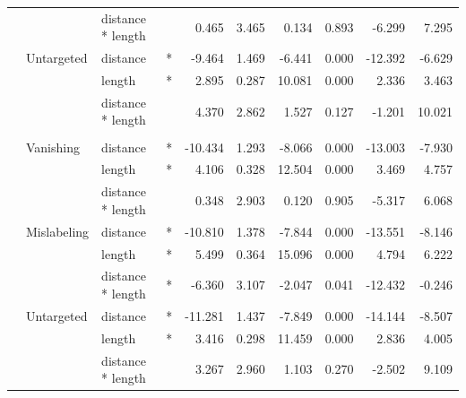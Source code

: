\documentclass[
]{article}
\begin{document}
\begin{longtable}[t]{llllrrrrrr}
\cmidrule{3-10}\nopagebreak
\hspace{1em} &  & distance * length &  & 0.465 & 3.465 & 0.134 & 0.893 & -6.299 & 7.295\\
\cmidrule{2-10}\nopagebreak
\hspace{1em} & Untargeted & distance & * & -9.464 & 1.469 & -6.441 & 0.000 & -12.392 & -6.629\\
\cmidrule{3-10}\nopagebreak
\hspace{1em} &  & length & * & 2.895 & 0.287 & 10.081 & 0.000 & 2.336 & 3.463\\
\cmidrule{3-10}\nopagebreak
\hspace{1em} &  & distance * length &  & 4.370 & 2.862 & 1.527 & 0.127 & -1.201 & 10.021\\
\cmidrule{1-10}\pagebreak[0]
\addlinespace[0.3em]
\multicolumn{10}{l}{\textbf{SSD}}\\
\hspace{1em} & Vanishing & distance & * & -10.434 & 1.293 & -8.066 & 0.000 & -13.003 & -7.930\\
\cmidrule{3-10}\nopagebreak
\hspace{1em} &  & length & * & 4.106 & 0.328 & 12.504 & 0.000 & 3.469 & 4.757\\
\cmidrule{3-10}\nopagebreak
\hspace{1em} &  & distance * length &  & 0.348 & 2.903 & 0.120 & 0.905 & -5.317 & 6.068\\
\cmidrule{2-10}\nopagebreak
\hspace{1em} & Mislabeling & distance & * & -10.810 & 1.378 & -7.844 & 0.000 & -13.551 & -8.146\\
\cmidrule{3-10}\nopagebreak
\hspace{1em} &  & length & * & 5.499 & 0.364 & 15.096 & 0.000 & 4.794 & 6.222\\
\cmidrule{3-10}\nopagebreak
\hspace{1em} &  & distance * length & * & -6.360 & 3.107 & -2.047 & 0.041 & -12.432 & -0.246\\
\cmidrule{2-10}\nopagebreak
\hspace{1em} & Untargeted & distance & * & -11.281 & 1.437 & -7.849 & 0.000 & -14.144 & -8.507\\
\cmidrule{3-10}\nopagebreak
\hspace{1em} &  & length & * & 3.416 & 0.298 & 11.459 & 0.000 & 2.836 & 4.005\\
\cmidrule{3-10}\nopagebreak
\hspace{1em} &  & distance * length &  & 3.267 & 2.960 & 1.103 & 0.270 & -2.502 & 9.109\\

\end{longtable}
\end{document}
